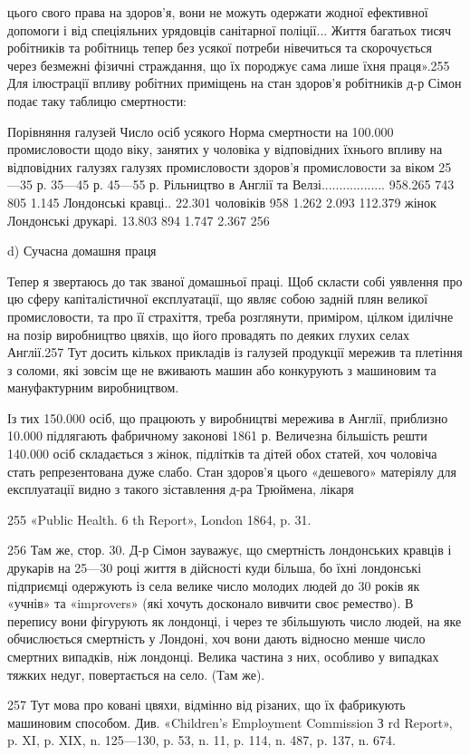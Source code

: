 цього свого права на здоров’я, вони не можуть одержати жодної
ефективної допомоги і від спеціяльних урядовців санітарної
поліції... Життя багатьох тисяч робітників та робітниць тепер
без усякої потреби нівечиться та скорочується через безмежні
фізичні страждання, що їх породжує сама лише їхня праця».255
Для ілюстрації впливу робітних приміщень на стан здоров’я
робітників д-р Сімон подає таку таблицю смертности:

Порівняння галузей     Число осіб усякого         Норма смертности на 100.000
промисловости щодо   віку, занятих у                чоловіка у відповідних
їхнього впливу на         відповідних галузях      галузях промисловости
здоров'я                           промисловости                за віком
                                                                                          25—35 р.  
      35—45 р.         45—55 р.
Рільництво в Англії
та Велзі..................              958.265                                  743                
   805               1.145
Лондонські кравці..       22.301 чоловіків                        958                1.262          
    2.093
                                              112.379 жінок
Лондонські друкарі.            13.803                                     894                 1.747 
            2.367 256

d) Сучасна домашня праця

Тепер я звертаюсь до так званої домашньої праці. Щоб скласти
собі уявлення про цю сферу капіталістичної експлуатації, що
являє собою задній плян великої промисловости, та про її страхіття,
треба розглянути, приміром, цілком ідилічне на позір виробництво
цвяхів, що його провадять по деяких глухих селах Англії.257
Тут досить кількох прикладів із галузей продукції мережив та
плетіння з соломи, які зовсім ще не вживають машин або конкурують
з машиновим та мануфактурним виробництвом.

Із тих 150.000 осіб, що працюють у виробництві мережива в
Англії, приблизно 10.000 підлягають фабричному законові 1861 р.
Величезна більшість решти 140.000 осіб складається з жінок,
підлітків та дітей обох статей, хоч чоловіча стать репрезентована
дуже слабо. Стан здоров’я цього «дешевого» матеріялу для експлуатації
видно з такого зіставлення д-ра Трюймена, лікаря

255 «Public Health. 6 th Report», London 1864, p. 31.

256 Там же, стор. 30. Д-р Сімон зауважує, що смертність лондонських
кравців і друкарів на 25—30 році життя в дійсності куди більша,
бо їхні лондонські підприємці одержують із села велике число молодих
людей до 30 років як «учнів» та «improvers» (які хочуть досконало вивчити
своє ремество). В перепису вони фігурують як лондонці, і через те
збільшують число людей, на яке обчислюється смертність у Лондоні,
хоч вони дають відносно менше число смертних випадків, ніж лондонці.
Велика частина з них, особливо у випадках тяжких недуг, повертається
на село. (Там же).

257 Тут мова про ковані цвяхи, відмінно від різаних, що їх фабрикують
машиновим способом. Див. «Children’s Employment Commission
З rd Report», p. XI, p. XIX, n. 125—130, p. 53, n. 11, p. 114, n. 487,
p. 137, n. 674.
